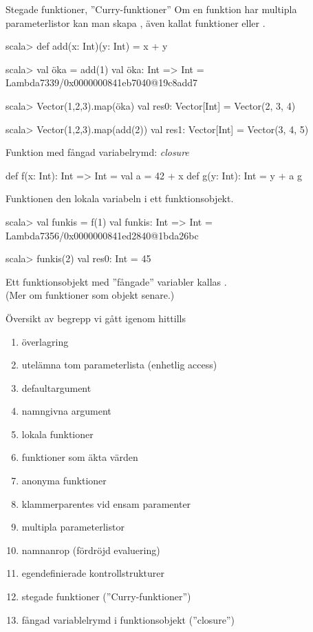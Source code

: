 \begin{Slide}{Stegade funktioner, ''Curry-funktioner''}
Om en funktion har multipla parameterlistor kan man skapa  , även kallat  funktioner  eller .
\begin{REPLnonum}
scala> def add(x: Int)(y: Int) = x + y

scala> val öka = add(1)
val öka: Int => Int = Lambda7339/0x0000000841eb7040@19c8add7

scala> Vector(1,2,3).map(öka)
val res0: Vector[Int] = Vector(2, 3, 4)

scala> Vector(1,2,3).map(add(2))
val res1: Vector[Int] = Vector(3, 4, 5)
\end{REPLnonum}
\end{Slide}


\begin{Slide}{Funktion med fångad variabelrymd: \textit{closure}}
\begin{Code}
def f(x: Int): Int => Int = 
  val a = 42 + x
  def g(y: Int): Int = y + a
  g
\end{Code}
Funktionen   den lokala variabeln  i ett funktionsobjekt.
\pause
\begin{REPLnonum}
scala> val funkis = f(1)
val funkis: Int => Int = Lambda7356/0x0000000841ed2840@1bda26bc

scala> funkis(2)
val res0: Int = 45
\end{REPLnonum}
\pause
Ett funktionsobjekt med ''fångade'' variabler kallas . \\
(Mer om funktioner som objekt senare.)
\end{Slide}

\ifkompendium\else
\begin{SlideExtra}{Översikt av begrepp vi gått igenom hittills}
\begin{enumerate}
\item överlagring
\item utelämna tom parameterlista (enhetlig access)
\item defaultargument
\item namngivna argument
\item lokala funktioner
\item funktioner som äkta värden
\item anonyma funktioner
\item klammerparentes vid ensam paramenter
\item multipla parameterlistor
\item namnanrop (fördröjd evaluering)
\item egendefinierade kontrollstrukturer
\item stegade funktioner (''Curry-funktioner'')
\item fångad variablelrymd i funktionsobjekt (''closure'')
\end{enumerate}
\end{SlideExtra}
\fi



